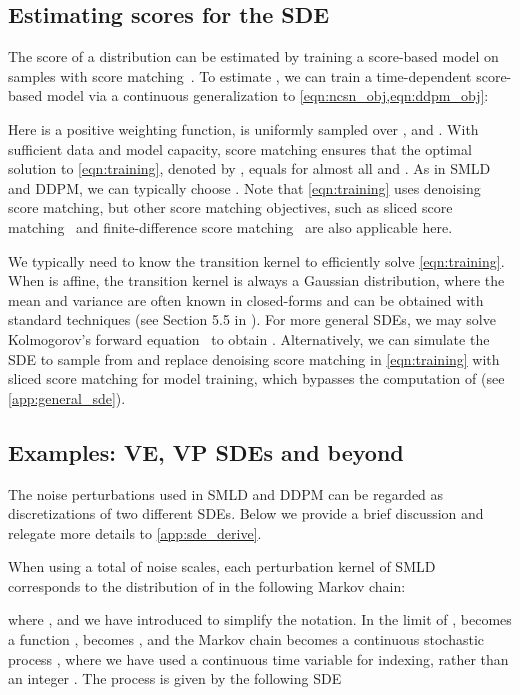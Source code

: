 \documentclass{article} \usepackage{iclr2021_conference,times}
\begin{document}
\subsection{Estimating scores for the SDE}\label{sec:training}
The score of a distribution can be estimated by training a score-based model on samples with score matching~\citep{hyvarinen2005estimation,song2019sliced}. To estimate , we can train a time-dependent score-based model  via a continuous generalization to \cref{eqn:ncsn_obj,eqn:ddpm_obj}:

Here  is a positive weighting function,  is uniformly sampled over ,  and . With sufficient data and model capacity, score matching ensures that the optimal solution to \cref{eqn:training}, denoted by , equals  for almost all  and . As in SMLD and DDPM, we can typically choose . Note that \cref{eqn:training} uses denoising score matching, but other score matching objectives, such as sliced score matching~\citep{song2019sliced} and finite-difference score matching~\citep{pang2020efficient} are also applicable here. 

We typically need to know the transition kernel  to efficiently solve \cref{eqn:training}. When  is affine, the transition kernel is always a Gaussian distribution, where the mean and variance are often known in closed-forms and can be obtained with standard techniques (see Section 5.5 in \citet{sarkka2019applied}). For more general SDEs, we may solve Kolmogorov's forward equation~\citep{oksendal2003stochastic} to obtain . Alternatively, we can simulate the SDE to sample from  and replace denoising score matching in \cref{eqn:training} with sliced score matching for model training, which bypasses the computation of  (see \cref{app:general_sde}).




\subsection{Examples: VE, VP SDEs and beyond}\label{sec:sde_examples}
The noise perturbations used in SMLD and DDPM can be regarded as discretizations of two different SDEs. Below we provide a brief discussion and relegate more details to \cref{app:sde_derive}.

When using a total of  noise scales, each perturbation kernel  of SMLD corresponds to the distribution of  in the following Markov chain:

where , and we have introduced  to simplify the notation.
In the limit of ,  becomes a function ,  becomes , and the Markov chain  becomes a continuous stochastic process , where we have used a continuous time variable  for indexing, rather than an integer . The process  is given by the following SDE
\end{document}
